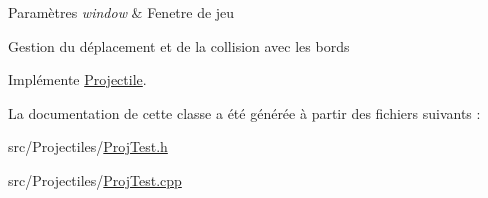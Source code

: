 \begin{DoxyParams}{Paramètres}
{\em window} & Fenetre de jeu\\
\hline
\end{DoxyParams}
Gestion du déplacement et de la collision avec les bords 

Implémente \hyperlink{class_projectile_aa969857f9837d9be3a6ea415c9ba3ff1}{Projectile}.



La documentation de cette classe a été générée à partir des fichiers suivants \+:\begin{DoxyCompactItemize}
\item 
src/\+Projectiles/\hyperlink{_proj_test_8h}{Proj\+Test.\+h}\item 
src/\+Projectiles/\hyperlink{_proj_test_8cpp}{Proj\+Test.\+cpp}\end{DoxyCompactItemize}
